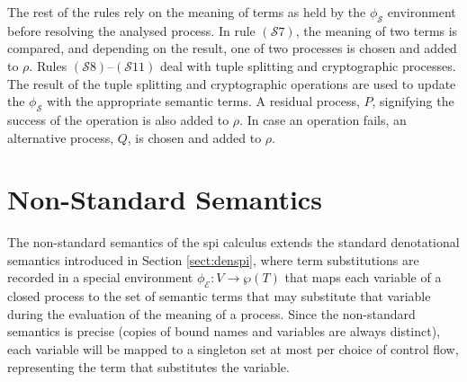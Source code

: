 \documentclass{entcs} \usepackage{entcsmacro}
\begin{document}
The rest of the rules rely on the meaning of terms as held by the $\phi_\mathcal{S}$ environment before resolving the analysed process.  In rule $(\mathcal{S}7)$, the meaning of two terms is compared, and depending on the result, one of two processes is chosen and added to $\rho$.  Rules $(\mathcal{S}8)$--$(\mathcal{S}11)$ deal with tuple splitting and cryptographic processes. The result of the tuple splitting and cryptographic operations are used to update the $\phi_\mathcal{S}$ with the appropriate semantic terms.  A residual process, $P$, signifying the success of the operation is also added to $\rho$.  In case an operation fails, an alternative process, $Q$, is chosen and added to $\rho$.
\section{Non-Standard Semantics\label{sect:nonstandspi}}
The non-standard semantics of the spi calculus extends the standard denotational semantics introduced in Section \ref{sect:denspi}, where term substitutions are recorded in a special environment $\phi_\mathcal{E}:V\to\wp(T)$ that maps each variable of a closed process to the set of semantic terms that may substitute that variable during the evaluation of the meaning of a process.  Since the non-standard semantics is precise (copies of bound names and variables are always distinct), each variable will be mapped to a singleton set at most per choice of control flow, representing the term that substitutes the variable.
\end{document}
